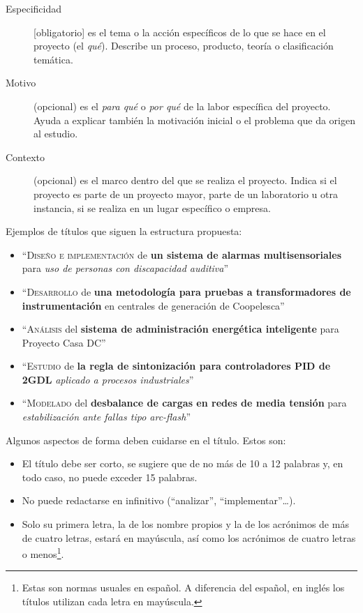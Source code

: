\begin{description}
\item[Especificidad] [obligatorio] es el tema o la acción específicos de lo que se hace en el proyecto (el \emph{qué}). Describe un proceso, producto, teoría o clasificación temática.
\item[Motivo] (opcional) es el \emph{para qué} o \emph{por qué} de la labor específica del proyecto. Ayuda a explicar también la motivación inicial o el problema que da origen al estudio.
\item[Contexto] (opcional) es el marco dentro del que se realiza el proyecto. Indica si el proyecto es parte de un proyecto mayor, parte de un laboratorio u otra instancia, si se realiza en un lugar específico o empresa.
\end{description}

Ejemplos de títulos que siguen la estructura propuesta:

\begin{itemize}
\item ``\textsc{Diseño e implementación} de \textbf{un sistema de alarmas multisensoriales} para \textit{uso de personas con discapacidad auditiva}''

\item ``\textsc{Desarrollo} de \textbf{una metodología para pruebas a transformadores de instrumentación} en \textsf{centrales de generación de Coopelesca}''

\item ``\textsc{Análisis} del \textbf{sistema de administración energética inteligente} para \textsf{Proyecto Casa DC}''

\item ``\textsc{Estudio} de \textbf{la regla de sintonización para controladores PID de 2GDL} \textit{aplicado a procesos industriales}''

\item ``\textsc{Modelado} del \textbf{desbalance de cargas en redes de media tensión} para \textit{estabilización ante fallas tipo arc-flash}''
\end{itemize}

Algunos aspectos de forma deben cuidarse en el título. Estos son:

\begin{itemize}
\item El título debe ser corto, se sugiere que de no más de 10 a 12 palabras y, en todo caso, no puede exceder 15 palabras.
\item No puede redactarse en infinitivo (``analizar'', ``implementar''\ldots).
\item Solo su primera letra, la de los nombre propios y la de los acrónimos de más de cuatro letras, estará en mayúscula, así como los acrónimos de cuatro letras o menos\footnote{Estas son normas usuales en español. A diferencia del español, en inglés los títulos utilizan cada letra en mayúscula.}.
\end{itemize}

